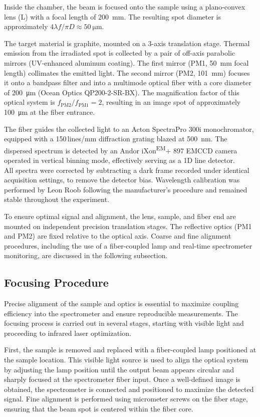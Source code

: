 \documentclass[
	parskip=half,
	a4paper,
]{scrarticle}
\begin{document}
Inside the chamber, the beam is focused onto the sample using a plano-convex lens (L) with a focal length of \SI{200}{\milli\meter}. The resulting spot diameter is approximately \( 4\lambda f / \pi D \approx \SI{50}{\micro\meter} \).

The target material is graphite, mounted on a 3-axis translation stage. Thermal emission from the irradiated spot is collected by a pair of off-axis parabolic mirrors (UV-enhanced aluminum coating). The first mirror (PM1, \SI{50}{\milli\meter} focal length) collimates the emitted light. The second mirror (PM2, \SI{101}{\milli\meter}) focuses it onto a bandpass filter and into a multimode optical fiber with a core diameter of \SI{200}{\micro\meter} (Ocean Optics QP200-2-SR-BX). The magnification factor of this optical system is \( f_{\text{PM2}} / f_{\text{PM1}} = 2 \), resulting in an image spot of approximately \SI{100}{\micro\meter} at the fiber entrance.

The fiber guides the collected light to an Acton SpectraPro 300i monochromator, equipped with a 150\,lines/mm diffraction grating blazed at \SI{500}{\nano\meter}. The dispersed spectrum is detected by an Andor iXon\textsuperscript{EM}+ 897 EMCCD camera operated in vertical binning mode, effectively serving as a 1D line detector.\\
All spectra were corrected by subtracting a dark frame recorded under identical acquisition settings, to remove the detector bias. Wavelength calibration was performed by Leon Roob following the manufacturer's procedure and remained stable throughout the experiment.

To ensure optimal signal and alignment, the lens, sample, and fiber end are mounted on independent precision translation stages. The reflective optics (PM1 and PM2) are fixed relative to the optical axis. Coarse and fine alignment procedures, including the use of a fiber-coupled lamp and real-time spectrometer monitoring, are discussed in the following subsection.

\subsection{Focusing Procedure}
Precise alignment of the sample and optics is essential to maximize coupling efficiency into the spectrometer and ensure reproducible measurements. The focusing process is carried out in several stages, starting with visible light and proceeding to infrared laser optimization.

First, the sample is removed and replaced with a fiber-coupled lamp positioned at the sample location. This visible light source is used to align the optical system by adjusting the lamp position until the output beam appears circular and sharply focused at the spectrometer fiber input. Once a well-defined image is obtained, the spectrometer is connected and positioned to maximize the detected signal. Fine alignment is performed using micrometer screws on the fiber stage, ensuring that the beam spot is centered within the fiber core.
\end{document}
